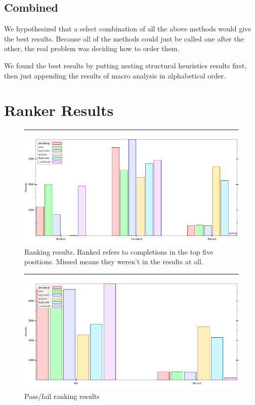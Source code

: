 \documentclass[ms,electronic,twosidetoc,letterpaper,chaptercenter,parttop,lol,lof,lot]{byumsphd}
\begin{document}
\subsection{Combined}

We hypothesized that a select combination of all the above methods would give the best results.
Because all of the methods could just be called one after the other, the real problem was deciding how to order them.

We found the best results by putting nesting structural heuristics results first, then just appending the results of macro analysis in alphabetical order.

\section{Ranker Results}

\begin{figure}[h]
\centering
\hrule
\includegraphics[width=1.0\textwidth]{../output/synthesis/ranker/Remove-combined.png}
\caption{Ranking results. Ranked refers to completions in the top five positions. Missed means they weren't in the results at all.}
\label{ranker-combined}
\end{figure}

\begin{figure}[h]
\centering
\hrule
\includegraphics[width=1.0\textwidth]{../output/synthesis/ranker/Remove-uber-combined.png}
\caption{Pass/fail ranking results}
\label{ranker-uber-combined}
\end{figure}
\end{document}

